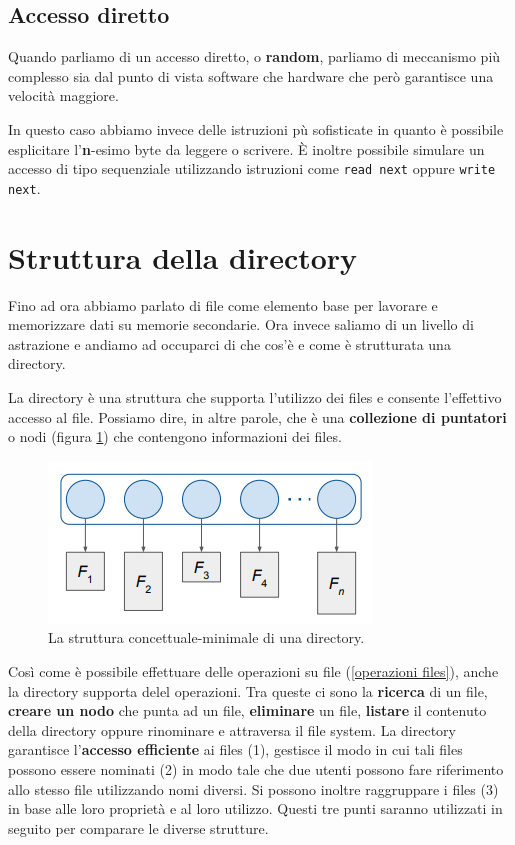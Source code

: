 % 
\subsection{Accesso diretto}
Quando parliamo di un accesso diretto, o \textbf{random}, parliamo di meccanismo più complesso sia dal punto di vista software che hardware che però garantisce una velocità maggiore. 

In questo caso abbiamo invece delle istruzioni pù sofisticate in quanto è possibile esplicitare l'\textbf{n}-esimo byte da leggere o scrivere. È inoltre possibile simulare un accesso di tipo sequenziale utilizzando istruzioni come \texttt{read next} oppure \texttt{write next}.

% 
\section{Struttura della directory}\label{directory}
Fino ad ora abbiamo parlato di file come elemento base per lavorare e memorizzare dati su memorie secondarie. Ora invece saliamo di un livello di astrazione e andiamo ad occuparci di che cos'è e come è strutturata una directory.

La directory è una struttura che supporta l'utilizzo dei files e  consente l'effettivo accesso al file. Possiamo dire, in altre parole, che è una \textbf{collezione di puntatori} o nodi (figura \ref{fig:struttura directory}) che contengono informazioni dei files.

\begin{figure}[h]
    \centering
    \includegraphics[width =.45\textwidth]{../res/imgs/file system interface/struttura directory.png}
    \caption{La struttura concettuale-minimale di una directory.}
    \label{fig:struttura directory}
\end{figure}

Così come è possibile effettuare delle operazioni su file (\ref{operazioni files}), anche la directory supporta delel operazioni. Tra queste ci sono la \textbf{ricerca} di un file, \textbf{creare un nodo} che punta ad un file, \textbf{eliminare} un file, \textbf{listare} il contenuto della directory oppure rinominare e attraversa il file system. La directory garantisce l'\textbf{accesso efficiente} ai files (1), gestisce il modo in cui tali files possono essere nominati (2) in modo tale che due utenti possono fare riferimento allo stesso file utilizzando nomi diversi. Si possono inoltre raggruppare i files (3) in base alle loro proprietà e al loro utilizzo. Questi tre punti saranno utilizzati in seguito per comparare le diverse strutture.

